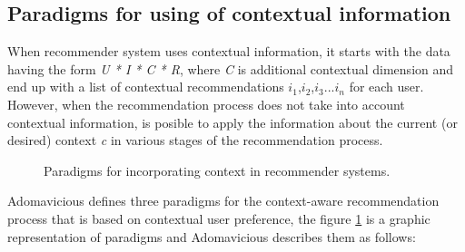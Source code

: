 \subsection{Paradigms for using of contextual information}

When recommender system uses contextual information, it starts
with the data having the form \textit{U * I * C * R}, where \textit{C}
is additional contextual dimension and end up with a list of
contextual recommendations $i_{1}$,$i_{2}$,$i_{3}$...$i_{n}$ for each
user. However, when the recommendation process does not take into
account  contextual information, is posible to apply the
information about the current (or desired) context \textit{c} in
various stages of the recommendation process.
\begin{figure}
\captionsetup{font=footnotesize}
\centering
{}
\small
\caption{Paradigms for incorporating context in recommender 
systems\cite{adomavicius2011context}.}
\label{fig:paradigms}   
\end{figure}
Adomavicious\cite{adomavicius2011context} defines three paradigms for
the context-aware recommendation process that is based on contextual
user preference, the figure \ref{fig:paradigms} is a graphic representation of paradigms and Adomavicious describes them as follows:
